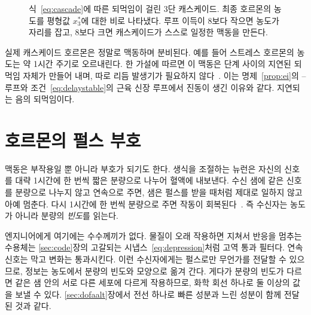 \begin{figure}[t]
\centering
{}
\caption{식~\eqref{eq:cascade}에 따른 되먹임이 걸린 3단 캐스케이드. 최종 호르몬의 농도를 평형값 $x_3^*$에 대한 비로 나타냈다. 루프 이득이 8보다 작으면 농도가 자리를 잡고, 8보다 크면 캐스케이드가 스스로 일정한 맥동을 만든다.}
\label{fig:cascade}
\end{figure}

실제 캐스케이드 호르몬은 정말로 맥동하며 분비된다. 예를 들어 스트레스 호르몬의 농도는 약 1시간 주기로 오르내린다. 한 가설에 따르면 이 맥동은 단계 사이의 지연된 되먹임 자체가 만들어 내며, 따로 리듬 발생기가 필요하지 않다~\cite{Walker2010}. 이는 명제~\ref{prop:ei}의 -- 루프와 조건~\eqref{eq:delaystable}의 근육 신장 루프에서 진동이 생긴 이유와 같다. 지연되는 음의 되먹임이다.

\section{호르몬의 펄스 부호}

맥동은 부작용일 뿐 아니라 부호가 되기도 한다. 생식을 조절하는 뉴런은 자신의 신호를 대략 1시간에 한 번씩 짧은 분량으로 나누어 혈액에 내보낸다. 수신 샘에 같은 신호를 분량으로 나누지 않고 연속으로 주면, 샘은 펄스를 받을 때처럼 제대로 일하지 않고 아예 멈춘다. 다시 1시간에 한 번씩 분량으로 주면 작동이 회복된다~\cite{Belchetz1978}. 즉 수신자는 농도가 아니라 분량의 \emph{빈도}를 읽는다.

엔지니어에게 여기에는 수수께끼가 없다. 물질이 오래 작용하면 지쳐서 반응을 멈추는 수용체는 \ref{sec:code}장의 고갈되는 시냅스~\eqref{eq:depression}처럼 고역 통과 필터다. 연속 신호는 막고 변화는 통과시킨다. 이런 수신자에게는 펄스로만 무언가를 전달할 수 있으므로, 정보는 농도에서 분량의 빈도와 모양으로 옮겨 간다. 게다가 분량의 빈도가 다르면 같은 샘 안의 서로 다른 세포에 다르게 작용하므로, 화학 회선 하나로 둘 이상의 값을 보낼 수 있다. \ref{sec:dofaalt}장에서  전선 하나로 빠른 성분과 느린 성분이 함께 전달된 것과 같다.

